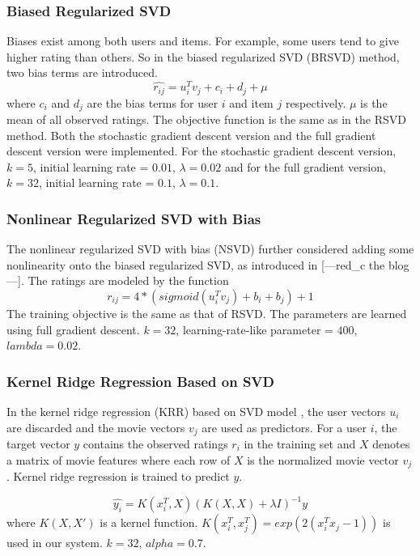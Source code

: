 \documentclass[10pt,conference,compsocconf]{IEEEtran}
\begin{document}
\subsubsection{Biased Regularized SVD}
Biases exist among both users and items. For example, some users tend to give higher rating than others. So in the biased regularized SVD (BRSVD) method, two bias terms are introduced.
$$ \hat{r_{ij}}=u_{i}^{T}v_{j} + c_i + d_j  + \mu $$
where $c_i$ and $d_j$ are the bias terms for user $i$ and item $j$ respectively. $\mu$ is the mean of all observed ratings. The objective function is the same as in the RSVD method.
Both the stochastic gradient descent version and the full gradient descent version were implemented. For the stochastic gradient descent version, $k=5$, initial learning rate = $0.01$, $\lambda=0.02$ and for the full gradient version, $k=32$, initial learning rate = $0.1$, $\lambda=0.1$.

\subsubsection{Nonlinear Regularized SVD with Bias}
The nonlinear regularized SVD with bias (NSVD) further considered adding some nonlinearity onto the biased regularized SVD, as introduced in [---red\_c the blog---]. The ratings are modeled by the function $$r_{ij}= 4*(sigmoid(u_{i}^{T}v_{j}) + b_i + b_j)+1$$
The training objective is the same as that of RSVD. The parameters are learned using full gradient descent. $k=32$, learning-rate-like parameter = $400$, $lambda = 0.02$.

\subsubsection{Kernel Ridge Regression Based on SVD}
In the kernel ridge regression (KRR) based on SVD model \cite{Paterek2007Improving}, the user vectors $u_i$ are discarded and the movie vectors $v_j$ are used as predictors. For a user $i$, the target vector $y$ contains the observed ratings $r_i$ in the training set and $X$ denotes a matrix of movie features where each row of $X$ is the normalized movie vector $v_j$. Kernel ridge regression is trained to predict $y$.

$$ \hat{y_i} = K(x_i^T, X)(K(X,X) + \lambda I)^{-1}y$$
where $K(X, X')$ is a kernel function. $K(x_{i}^{T}, x_{j}^{T})=exp(2(x_i^Tx_j-1))$ is used in our system. $k=32$, $alpha=0.7$.
\end{document}
